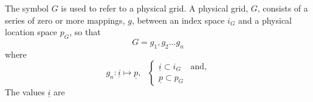 The symbol $G$ is used to refer to a physical grid. A physical grid, $G$, 
consists of a series of zero or more mappings, $g$, between an index space 
$i_{G}$ and a physical location space $p_{G}$, so that
\begin{equation}
G = g_{1}, g_{2} \ldots g_{n}
\end{equation}
\noindent where
\begin{equation}
g_{n}: \underline{i} \mapsto \underline{p},~~~
\begin{cases}
  \underline{i} \subset i_{G} & \text{and}, \\
  \underline{p} \subset p_{G} & \text{}
\end{cases}
\end{equation}
The values $\underline{i}$ are 
